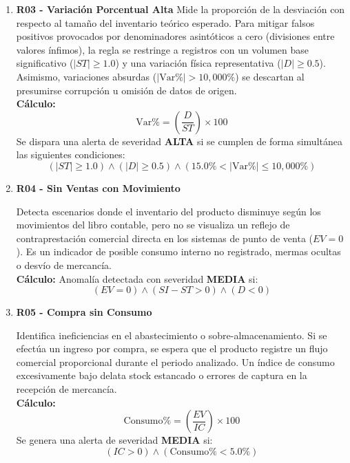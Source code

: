 \documentclass[11pt]{article}
\begin{document}
\begin{enumerate}
    \item \textbf{R03 - Variación Porcentual Alta}
         Mide la proporción de la desviación con respecto al tamaño del inventario teórico esperado. Para mitigar falsos positivos provocados por denominadores asintóticos a cero (divisiones entre valores ínfimos), la regla se restringe a registros con un volumen base significativo ($|ST| \ge 1.0$) y una variación física representativa ($|D| \ge 0.5$). Asimismo, variaciones absurdas ($|\text{Var\%}| > 10,000\%$) se descartan al presumirse corrupción u omisión de datos de origen.
         \\
        \textbf{Cálculo:}
        \[ \text{Var\%} = \left( \frac{D}{ST} \right) \times 100 \]
        Se dispara una alerta de severidad \textbf{ALTA} si se cumplen de forma simultánea las siguientes condiciones:
        \[ \left( |ST| \ge 1.0 \right) \land \left( |D| \ge 0.5 \right) \land \left( 15.0\% < |\text{Var\%}| \le 10,000\% \right) \]

    \item \textbf{R04 - Sin Ventas con Movimiento}
    
         Detecta escenarios donde el inventario del producto disminuye según los movimientos del libro contable, pero no se visualiza un reflejo de contraprestación comercial directa en los sistemas de punto de venta ($EV = 0$). Es un indicador de posible consumo interno no registrado, mermas ocultas o desvío de mercancía.
         \\
        \textbf{Cálculo:}
        Anomalía detectada con severidad \textbf{MEDIA} si:
        \[ (EV = 0) \land (SI - ST > 0) \land (D < 0) \]
    

    \item \textbf{R05 - Compra sin Consumo}
    
         Identifica ineficiencias en el abastecimiento o sobre-almacenamiento. Si se efectúa un ingreso por compra, se espera que el producto registre un flujo comercial proporcional durante el periodo analizado. Un índice de consumo excesivamente bajo delata stock estancado o errores de captura en la recepción de mercancía.
         \\
        \textbf{Cálculo:}
        \[ \text{Consumo\%} = \left( \frac{EV}{IC} \right) \times 100 \]
        Se genera una alerta de severidad \textbf{MEDIA} si:
        \[ (IC > 0) \land (\text{Consumo\%} < 5.0\%) \]
    


\end{enumerate}
\end{document}
